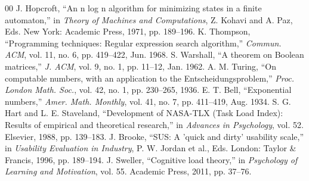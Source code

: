 \documentclass[conference]{IEEEtran}
\begin{document}
\begin{thebibliography}{00}
 J. Hopcroft, ``An n log n algorithm for minimizing states in a finite automaton,'' in \textit{Theory of Machines and Computations}, Z. Kohavi and A. Paz, Eds. New York: Academic Press, 1971, pp. 189--196.
 K. Thompson, ``Programming techniques: Regular expression search algorithm,'' \textit{Commun. ACM}, vol. 11, no. 6, pp. 419--422, Jun. 1968.
 S. Warshall, ``A theorem on Boolean matrices,'' \textit{J. ACM}, vol. 9, no. 1, pp. 11--12, Jan. 1962.
 A. M. Turing, ``On computable numbers, with an application to the Entscheidungsproblem,'' \textit{Proc. London Math. Soc.}, vol. 42, no. 1, pp. 230--265, 1936.
 E. T. Bell, ``Exponential numbers,'' \textit{Amer. Math. Monthly}, vol. 41, no. 7, pp. 411--419, Aug. 1934.
 S. G. Hart and L. E. Staveland, ``Development of NASA-TLX (Task Load Index): Results of empirical and theoretical research,'' in \textit{Advances in Psychology}, vol. 52. Elsevier, 1988, pp. 139--183.
 J. Brooke, ``SUS: A 'quick and dirty' usability scale,'' in \textit{Usability Evaluation in Industry}, P. W. Jordan et al., Eds. London: Taylor \& Francis, 1996, pp. 189--194.
 J. Sweller, ``Cognitive load theory,'' in \textit{Psychology of Learning and Motivation}, vol. 55. Academic Press, 2011, pp. 37--76.
\end{thebibliography}
\end{document}

